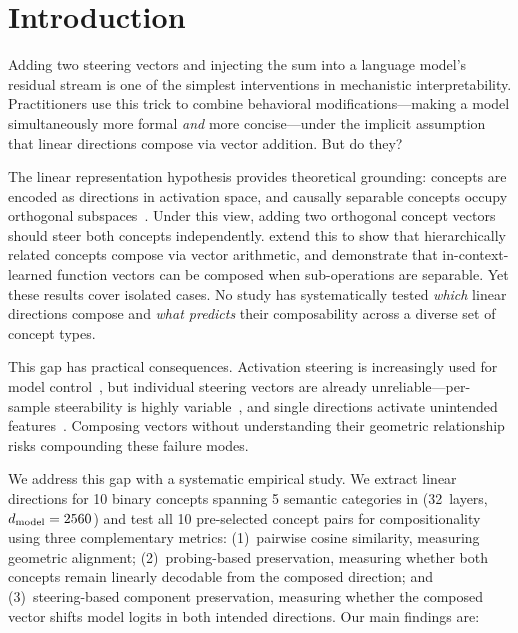 \section{Introduction}
\label{sec:intro}

Adding two steering vectors and injecting the sum into a language model's
residual stream is one of the simplest interventions in mechanistic
interpretability. Practitioners use this trick to combine behavioral
modifications---\eg making a model simultaneously more formal \emph{and} more
concise---under the implicit assumption that linear directions compose via
vector addition. But do they?

The linear representation hypothesis provides theoretical grounding: concepts
are encoded as directions in activation space, and causally separable concepts
occupy orthogonal subspaces~\citep{park2023linear}. Under this view, adding two
orthogonal concept vectors should steer both concepts independently.
\citet{park2024geometry} extend this to show that hierarchically related
concepts compose via vector arithmetic, and \citet{todd2023function} demonstrate
that in-context-learned function vectors can be composed when sub-operations are
separable. Yet these results cover isolated cases. No study has systematically
tested \emph{which} linear directions compose and \emph{what predicts} their
composability across a diverse set of concept types.

This gap has practical consequences. Activation steering is increasingly used
for model control~\citep{stolfo2024improving}, but individual steering vectors
are already unreliable---per-sample steerability is highly
variable~\citep{tan2024analyzing}, and single directions activate unintended
features~\citep{chalnev2024improving}. Composing vectors without understanding
their geometric relationship risks compounding these failure modes.

We address this gap with a systematic empirical study. We extract linear
directions for 10 binary concepts spanning 5 semantic categories in \pythia
(32~layers, $d_{\text{model}} = 2560$) and test all 10 pre-selected concept pairs for
compositionality using three complementary metrics: (1)~pairwise cosine
similarity, measuring geometric alignment; (2)~probing-based preservation,
measuring whether both concepts remain linearly decodable from the composed
direction; and (3)~steering-based component preservation, measuring whether the
composed vector shifts model logits in both intended directions. Our main
findings are:

